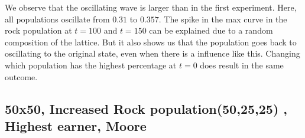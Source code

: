 \documentclass[a4paper, 11pt]{article}
\begin{document}
\begin{landscape}
We observe that the oscillating wave is larger than in the first experiment. Here, all populations oscillate from $0.31$ to $0.357$. The spike in the max curve in the rock population at $t=100$ and $t=150$ can be explained due to a random composition of the lattice. But it also shows us that the population goes back to oscillating to the original state, even when there is a influence like this. Changing which population has the highest percentage at $t=0$ does result in the same outcome.

\end{landscape}





\newpage
\begin{landscape}
\subsection{50x50, Increased Rock population(50,25,25) , Highest earner, Moore}


\end{landscape}
\end{document}
